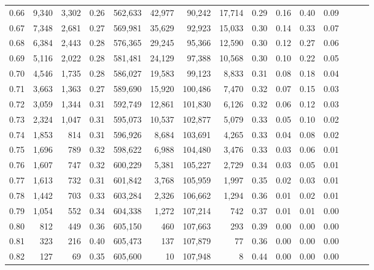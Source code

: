 \begin{tabular}{rrrrrrrrrrrrrrr}
0.66 &   9,340 &  3,302 &  0.26 &  562,633 &   42,977 &   90,242 &   17,714 &  0.29 &  0.16 &  0.40 &      0.09 \\
0.67 &   7,348 &  2,681 &  0.27 &  569,981 &   35,629 &   92,923 &   15,033 &  0.30 &  0.14 &  0.33 &      0.07 \\
0.68 &   6,384 &  2,443 &  0.28 &  576,365 &   29,245 &   95,366 &   12,590 &  0.30 &  0.12 &  0.27 &      0.06 \\
0.69 &   5,116 &  2,022 &  0.28 &  581,481 &   24,129 &   97,388 &   10,568 &  0.30 &  0.10 &  0.22 &      0.05 \\
0.70 &   4,546 &  1,735 &  0.28 &  586,027 &   19,583 &   99,123 &    8,833 &  0.31 &  0.08 &  0.18 &      0.04 \\
0.71 &   3,663 &  1,363 &  0.27 &  589,690 &   15,920 &  100,486 &    7,470 &  0.32 &  0.07 &  0.15 &      0.03 \\
0.72 &   3,059 &  1,344 &  0.31 &  592,749 &   12,861 &  101,830 &    6,126 &  0.32 &  0.06 &  0.12 &      0.03 \\
0.73 &   2,324 &  1,047 &  0.31 &  595,073 &   10,537 &  102,877 &    5,079 &  0.33 &  0.05 &  0.10 &      0.02 \\
0.74 &   1,853 &    814 &  0.31 &  596,926 &    8,684 &  103,691 &    4,265 &  0.33 &  0.04 &  0.08 &      0.02 \\
0.75 &   1,696 &    789 &  0.32 &  598,622 &    6,988 &  104,480 &    3,476 &  0.33 &  0.03 &  0.06 &      0.01 \\
0.76 &   1,607 &    747 &  0.32 &  600,229 &    5,381 &  105,227 &    2,729 &  0.34 &  0.03 &  0.05 &      0.01 \\
0.77 &   1,613 &    732 &  0.31 &  601,842 &    3,768 &  105,959 &    1,997 &  0.35 &  0.02 &  0.03 &      0.01 \\
0.78 &   1,442 &    703 &  0.33 &  603,284 &    2,326 &  106,662 &    1,294 &  0.36 &  0.01 &  0.02 &      0.01 \\
0.79 &   1,054 &    552 &  0.34 &  604,338 &    1,272 &  107,214 &      742 &  0.37 &  0.01 &  0.01 &      0.00 \\
0.80 &     812 &    449 &  0.36 &  605,150 &      460 &  107,663 &      293 &  0.39 &  0.00 &  0.00 &      0.00 \\
0.81 &     323 &    216 &  0.40 &  605,473 &      137 &  107,879 &       77 &  0.36 &  0.00 &  0.00 &      0.00 \\
0.82 &     127 &     69 &  0.35 &  605,600 &       10 &  107,948 &        8 &  0.44 &  0.00 &  0.00 &      0.00 \\

\end{tabular}
